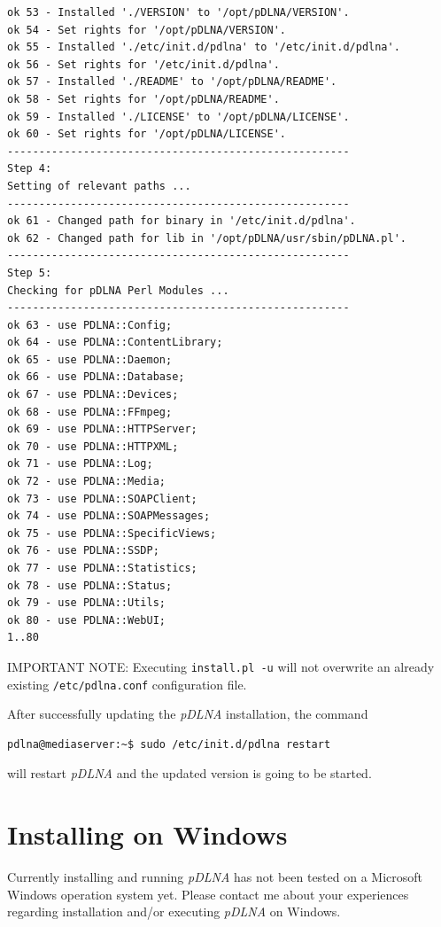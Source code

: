 \documentclass[a4paper,oneside,10pt]{report}
\newenvironment{colframeimportantnote}{%
  \begin{Sbox}
    \begin{minipage}{.99\columnwidth}
}{%
  \end{minipage}
  \end{Sbox}
  \begin{center}
    \fcolorbox{black}{Orange}{\TheSbox}
  \end{center}
}
\begin{document}
\begin{lstlisting}
ok 53 - Installed './VERSION' to '/opt/pDLNA/VERSION'.
ok 54 - Set rights for '/opt/pDLNA/VERSION'.
ok 55 - Installed './etc/init.d/pdlna' to '/etc/init.d/pdlna'.
ok 56 - Set rights for '/etc/init.d/pdlna'.
ok 57 - Installed './README' to '/opt/pDLNA/README'.
ok 58 - Set rights for '/opt/pDLNA/README'.
ok 59 - Installed './LICENSE' to '/opt/pDLNA/LICENSE'.
ok 60 - Set rights for '/opt/pDLNA/LICENSE'.
------------------------------------------------------
Step 4:
Setting of relevant paths ...
------------------------------------------------------
ok 61 - Changed path for binary in '/etc/init.d/pdlna'.
ok 62 - Changed path for lib in '/opt/pDLNA/usr/sbin/pDLNA.pl'.
------------------------------------------------------
Step 5:
Checking for pDLNA Perl Modules ...
------------------------------------------------------
ok 63 - use PDLNA::Config;
ok 64 - use PDLNA::ContentLibrary;
ok 65 - use PDLNA::Daemon;
ok 66 - use PDLNA::Database;
ok 67 - use PDLNA::Devices;
ok 68 - use PDLNA::FFmpeg;
ok 69 - use PDLNA::HTTPServer;
ok 70 - use PDLNA::HTTPXML;
ok 71 - use PDLNA::Log;
ok 72 - use PDLNA::Media;
ok 73 - use PDLNA::SOAPClient;
ok 74 - use PDLNA::SOAPMessages;
ok 75 - use PDLNA::SpecificViews;
ok 76 - use PDLNA::SSDP;
ok 77 - use PDLNA::Statistics;
ok 78 - use PDLNA::Status;
ok 79 - use PDLNA::Utils;
ok 80 - use PDLNA::WebUI;
1..80
\end{lstlisting}

\begin{colframeimportantnote}
\textsc{IMPORTANT NOTE:} Executing \verb|install.pl -u| will not overwrite an already existing \verb|/etc/pdlna.conf| configuration file.
\end{colframeimportantnote}

After successfully updating the {\em pDLNA} installation, the command
\begin{lstlisting}
pdlna@mediaserver:~$ sudo /etc/init.d/pdlna restart
\end{lstlisting}
will restart {\em pDLNA} and the updated version is going to be started.

%
%

\chapter{Installing on Windows}
\label{install-windows}

Currently installing and running {\em pDLNA} has not been tested on a Microsoft Windows operation system yet. Please contact me about your experiences regarding installation and/or executing {\em pDLNA} on Windows.
\end{document}
